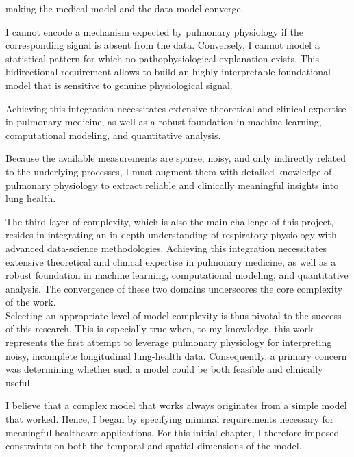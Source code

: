 making the medical model and the data model converge.



I cannot encode a mechanism expected by pulmonary physiology if the corresponding signal is absent from the data. Conversely, I cannot model a statistical pattern for which no pathophysiological explanation exists. This bidirectional requirement allows to build an highly interpretable foundational model that is sensitive to genuine physiological signal.

Achieving this integration necessitates extensive theoretical and clinical expertise in pulmonary medicine, as well as a robust foundation in machine learning, computational modeling, and quantitative analysis. 

Because the available measurements are sparse, noisy, and only indirectly related to the underlying processes, I must augment them with detailed knowledge of pulmonary physiology to extract reliable and clinically meaningful insights into lung health.

The third layer of complexity, which is also the main challenge of this project, resides in integrating an in-depth understanding of respiratory physiology with advanced data-science methodologies. Achieving this integration necessitates extensive theoretical and clinical expertise in pulmonary medicine, as well as a robust foundation in machine learning, computational modeling, and quantitative analysis. The convergence of these two domains underscores the core complexity of the work. \\



Selecting an appropriate level of model complexity is thus pivotal to the success of this research. This is especially true when, to my knowledge, this work represents the first attempt to leverage pulmonary physiology for interpreting noisy, incomplete longitudinal lung-health data. Consequently, a primary concern was determining whether such a model could be both feasible and clinically useful. 

I believe that a complex model that works always originates from a simple model that worked. Hence, I began by specifying minimal requirements necessary for meaningful healthcare applications. For this initial chapter, I therefore imposed constraints on both the temporal and spatial dimensions of the model.


